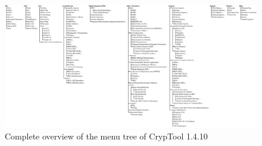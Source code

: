 \clearpage
\begin{figure}[hb]
\begin{center}
\vspace{-30pt}
\includegraphics[scale=0.25, angle=270, viewport=200 3 2680 1276]
                {figures/cryptool-menu-en}
\caption{Complete overview of the menu tree of CrypTool 1.4.10} 
\label{menuoverview}
\end{center}
\end{figure}
\clearpage

